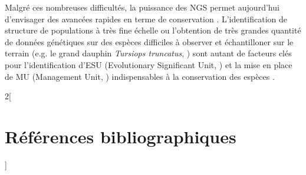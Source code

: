 \documentclass[a4paper,12pt,twoside]{article}\usepackage[]{graphicx}\usepackage[]{color}
\begin{document}
\begin {bibunit} [newbst]
Malgré ces nombreuses difficultés, la puissance des NGS permet aujourd'hui d'envisager des avancées rapides en terme de conservation \citep{shafer2015genomics}. L'identification de structure de populations à très fine échelle \citep{o2015rare} ou l'obtention de très grandes quantité de données génétiques sur des espèces difficiles à observer et échantilloner sur le terrain (e.g. le grand dauphin \emph{Tursiops truncatus}, \citealp{schipper2008status}) sont autant de facteurs clés pour l'identification d'ESU (Evolutionary Significant Unit, \citealp{ryder1986species}) et la mise en place de MU (Management Unit, \citealp{hawkins2016fisheries}) indispensables à la conservation des espèces \citep{casiraghi2016}.


\begin{otherlanguage}{english}
		\singlespacing
		\small
		\begin{multicols}{2}[\section{Références bibliographiques}]
		\def\section*#1{}
		\putbib [BibliographieEA]
	\end{multicols}
\end{otherlanguage}

\end {bibunit}

\newpage
\end{document}
